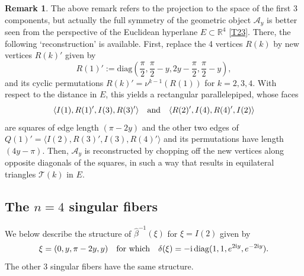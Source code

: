 \documentclass[a4paper,11pt,reqno]{amsart}
\theoremstyle{definition}
\newtheorem{rem}[thm]{Remark}
\numberwithin{equation}{section}
\newcommand{\be}{\begin{equation}}
\newcommand{\ee}{\end{equation}}
\def\cA{{\mathcal A}}                       %
\def\ri{{\mathrm{i}}}                       %
\def\bR{{\mathbb R}}                        %
\def\diag{\mathrm{diag}}                    %
\def\cT{{\mathcal T}}                       %
\begin{document}
\begin{rem}\label{rem42}
The above remark refers to the projection to the space of the first 3 components,
but actually the full symmetry of the geometric object $\cA_y$ is better seen from
the perspective of the Euclidean hyperlane $E \subset \bR^4$ \eqref{T23}.
There, the following `reconstruction' is available.
First, replace the 4 vertices $R(k)$ by new vertices $R(k)'$ given by
\be
R(1)' := \diag( \frac{\pi}{2}, \frac{\pi}{2}-y, 2y - \frac{\pi}{2}, \frac{\pi}{2}-y),
\ee
and its cyclic permutations $R(k)' = \nu^{k-1}(R(1))$ for $k=2,3,4$.
With respect to the distance in $E$, this yields a rectangular parallelepiped, whose faces
\be
\langle I(1), R(1)', I(3), R(3)'\rangle
\quad\hbox{and}\quad
 \langle R(2)', I(4), R(4)', I(2) \rangle
 \ee
are squares of edge length $(\pi - 2y)$ and the other two edges of
$ Q(1)' =  \langle I(2), R(3)', I(3), R(4)' \rangle$ and its permutations
have length $(4 y - \pi )$. Then, $\cA_y$ is reconstructed by chopping off the new vertices along
opposite diagonals of the squares, in such a way that results in equilateral triangles $\cT(k)$ in $E$.
\end{rem}


\subsection{The $n=4$ singular fibers}\label{Sec42}

We below describe the structure of $\hat \beta^{-1}(\xi)$  for $\xi= I(2)$ given by
\be
\xi = (0,y, \pi -2y, y)
\quad \hbox{for which} \quad
 \delta(\xi)  = - \ri\, \diag( 1,1, e^{2\ri y},  e^{-2\ri y}).
\label{F4}\ee
The other 3 singular fibers have the same structure.
\end{document}
